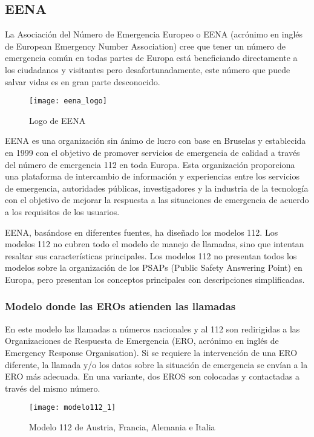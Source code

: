 \subsection{EENA}

La Asociación del Número de Emergencia Europeo o EENA (acrónimo en inglés de European Emergency Number Association) cree que tener un número de emergencia común en todas partes de Europa está beneficiando directamente a los ciudadanos y visitantes pero desafortunadamente, este número que puede salvar vidas es en gran parte desconocido.

\begin{figure}[htp!]
  \centering
  \texttt{[image: eena\_logo]}
  \caption{Logo de EENA}
  \label{fig:eena_logo}
\end{figure}

EENA es una organización sin ánimo de lucro con base en Bruselas y establecida en 1999 con el objetivo de promover servicios de emergencia de calidad a través del número de emergencia 112 en toda Europa. Esta organización proporciona una plataforma de intercambio de información y experiencias entre los servicios de emergencia, autoridades públicas, investigadores y la industria de la tecnología con el objetivo de mejorar la respuesta a las situaciones de emergencia de acuerdo a los requisitos de los usuarios.

EENA, basándose en diferentes fuentes, ha diseñado los modelos 112. Los modelos 112 no cubren todo el modelo de manejo de llamadas, sino que intentan resaltar sus características principales. Los modelos 112 no presentan todos los modelos sobre la organización de los PSAPs (Public Safety Answering Point) en Europa, pero presentan los conceptos principales con descripciones simplificadas.

\subsubsection{Modelo donde las EROs atienden las llamadas}

En este modelo las llamadas a números nacionales y al 112 son redirigidas a las  Organizaciones de Respuesta de Emergencia (ERO, acrónimo en inglés de Emergency Response Organisation). Si se requiere la intervención de una ERO diferente, la llamada y/o los datos sobre la situación de emergencia se envían a la ERO más adecuada. En una variante, dos EROS son colocadas y contactadas a través del mismo número.

\begin{figure}[htp!]
  \centering
  \texttt{[image: modelo112\_1]}
  \caption{Modelo 112 de Austria, Francia, Alemania e Italia}
  \label{fig:modelo112_1}
\end{figure}


